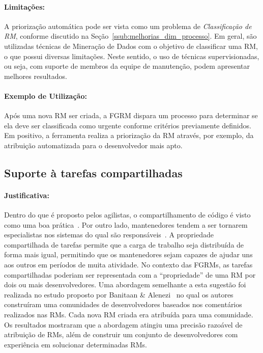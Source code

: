 \paragraph{Limitações:}
\label{par:limitacoes_s07}

A priorização automática pode ser vista como um problema de
\textit{Classificação de RM}, conforme discutido na
Seção~\ref{ssub:melhorias_dim_processo}. Em geral, são utilizadas técnicas de
Mineração de Dados com o objetivo de classificar uma RM, o que possui diversas
limitações. Neste sentido, o uso de técnicas supervisionadas, ou seja, com
suporte de membros da equipe de manutenção, podem apresentar melhores
resultados.

\paragraph{Exemplo de Utilização:}
\label{par:exemplo_de_utilização_s07}

Após uma nova RM ser criada, a FGRM dispara um processo para determinar se ela
deve ser classificada como urgente conforme critérios previamente definidos. Em
positivo, a ferramenta realiza a priorização da RM através, por exemplo, da
atribuição automatizada para o desenvolvedor mais apto.

\subsection{Suporte à tarefas compartilhadas}
\label{sub:suporte_tarefas_compartilhadas}


\paragraph{Justificativa:}
\label{par:justificativa_s08}

Dentro do que é proposto pelos agilistas, o compartilhamento de código é visto
como uma boa prática~\cite{meyer2014agile}. Por outro lado, mantenedores tendem
a ser tornarem especialistas nos sistemas do qual são
responsáveis~\cite{singer1998practices}. A propriedade compartilhada de tarefas
permite que a carga de trabalho seja distribuída de forma mais igual, permitindo
que os mantenedores sejam capazes de ajudar uns aos outros em períodos de muita
atividade. No contexto das FGRMs, as tarefas compartilhadas poderiam ser
representada com a ``propriedade'' de uma RM por dois ou mais desenvolvedores.
Uma abordagem semelhante a esta sugestão foi realizada no estudo proposto por
Banitaan \& Alenezi~\cite{banitaan2013decoba} no qual os autores construíram uma
comunidades de desenvolvedores baseados nos comentários realizados nas RMs. Cada
nova RM criada era atribuída para uma comunidade. Os resultados mostraram que a
abordagem atingiu uma precisão razoável de atribuição de RMs, além de construir
um conjunto de desenvolvedores com experiência em solucionar determinadas RMs.

